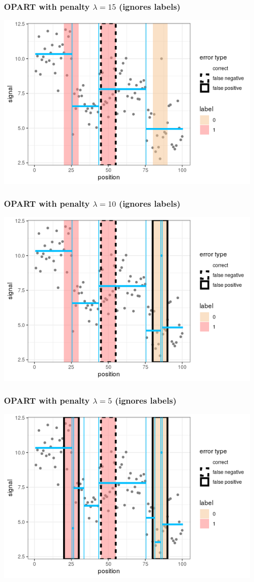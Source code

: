 \begin{frame}
  \frametitle{OPART with penalty $\lambda=15$ (ignores labels)}
  \includegraphics[width=\textwidth]{figure-baselines-penalty=15.png}
\end{frame}


\begin{frame}
  \frametitle{OPART with penalty $\lambda=10$ (ignores labels)}
  \includegraphics[width=\textwidth]{figure-baselines-penalty=10.png}
\end{frame}


\begin{frame}
  \frametitle{OPART with penalty $\lambda=5$ (ignores labels)}
  \includegraphics[width=\textwidth]{figure-baselines-penalty=5.png}
\end{frame}


